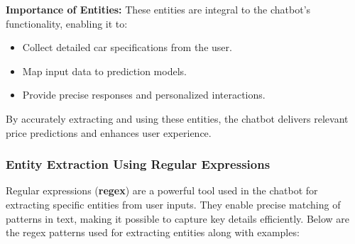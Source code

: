 \documentclass[a4paper,12pt]{article}
\begin{document}
\textbf{Importance of Entities:} 
These entities are integral to the chatbot's functionality, enabling it to:
\begin{itemize}
	\item Collect detailed car specifications from the user.
	\item Map input data to prediction models.
	\item Provide precise responses and personalized interactions.
\end{itemize}
By accurately extracting and using these entities, the chatbot delivers relevant price predictions and enhances user experience.

\subsubsection{Entity Extraction Using Regular Expressions}

Regular expressions (\textbf{regex}) are a powerful tool used in the chatbot for extracting specific entities from user inputs. They enable precise matching of patterns in text, making it possible to capture key details efficiently. Below are the regex patterns used for extracting entities along with examples:
\end{document}
